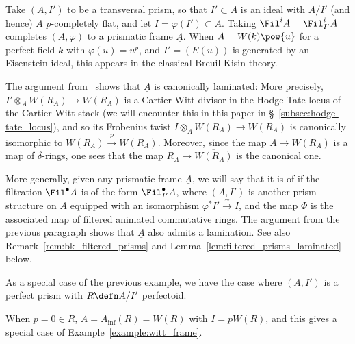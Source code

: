 \documentclass[10pt]{amsart}
\begin{document}
\begin{example}
\label{example:bk_frames}
Take $(A,I')$ to be a transversal prism, so that $I'\subset A$ is an ideal with $A/I'$ (and hence) $A$ $p$-completely flat, and let $I = \varphi(I')\subset A$. Taking $\Fil^iA = \Fil^i_{I'}A$ completes $(A,\varphi)$ to a prismatic frame $\underline{A}$. When $A = W(k)\pow{u}$ for a perfect field $k$ with $\varphi(u) = u^p$, and $I' = (E(u))$ is generated by an Eisenstein ideal, this appears in the classical Breuil-Kisin theory. 

The argument from~\cite[Proposition 3.6.6]{bhatt2022absolute} shows that $\underline{A}$ is canonically laminated: More precisely, $I'\otimes_AW(R_A)\to W(R_A)$ is a Cartier-Witt divisor in the Hodge-Tate locus of the Cartier-Witt stack (we will encounter this in this paper in \S~\ref{subsec:hodge-tate_locus}), and so its Frobenius twist $I\otimes_AW(R_A)\to W(R_A)$ is canonically isomorphic to $W(R_A)\xrightarrow{p}W(R_A)$. Moreover, since the map $A\to W(R_A)$ is a map of $\delta$-rings, one sees that the map $R_A\to \overline{W(R_A)}$ is the canonical one.

More generally, given any prismatic frame $\underline{A}$, we will say that it is of  if the filtration $\Fil^\bullet A$ is of the form $\Fil^\bullet_{I'}A$, where $(A,I')$ is another prism structure on $A$ equipped with an isomorphism $\varphi^*I'\xrightarrow{\simeq}I$, and the map $\Phi$ is the associated map of filtered animated commutative rings. The argument from the previous paragraph shows that $\underline{A}$ also admits a lamination. See also Remark~\ref{rem:bk_filtered_prisms} and Lemma~\ref{lem:filtered_prisms_laminated} below.
\end{example}



\begin{example}
\label{example:a_inf_frame}
As a special case of the previous example, we have the case where $(A,I')$ is a perfect prism with $R\defn A/I'$ perfectoid. 

When $p=0\in R$, $A = A_{\mathrm{inf}}(R) = W(R)$ with $I = pW(R)$, and this gives a special case of Example~\ref{example:witt_frame}.
\end{example}
\end{document}
